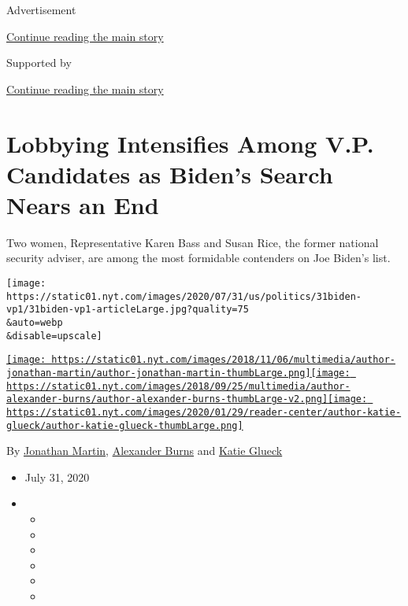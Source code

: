 Advertisement

\protect\hyperlink{after-top}{Continue reading the main story}

Supported by

\protect\hyperlink{after-sponsor}{Continue reading the main story}

\hypertarget{lobbying-intensifies-among-vp-candidates-as-bidens-search-nears-an-end}{%
\section{Lobbying Intensifies Among V.P. Candidates as Biden's Search
Nears an
End}\label{lobbying-intensifies-among-vp-candidates-as-bidens-search-nears-an-end}}

Two women, Representative Karen Bass and Susan Rice, the former national
security adviser, are among the most formidable contenders on Joe
Biden's list.

\texttt{[image: https://static01.nyt.com/images/2020/07/31/us/politics/31biden-vp1/31biden-vp1-articleLarge.jpg?quality=75\\\&auto=webp\\\&disable=upscale]}

\href{https://www.nytimes.com/by/jonathan-martin}{\texttt{[image: https://static01.nyt.com/images/2018/11/06/multimedia/author-jonathan-martin/author-jonathan-martin-thumbLarge.png]}}\href{https://www.nytimes.com/by/alexander-burns}{\texttt{[image: https://static01.nyt.com/images/2018/09/25/multimedia/author-alexander-burns/author-alexander-burns-thumbLarge-v2.png]}}\href{https://www.nytimes.com/by/katie-glueck}{\texttt{[image: https://static01.nyt.com/images/2020/01/29/reader-center/author-katie-glueck/author-katie-glueck-thumbLarge.png]}}

By \href{https://www.nytimes.com/by/jonathan-martin}{Jonathan Martin},
\href{https://www.nytimes.com/by/alexander-burns}{Alexander Burns} and
\href{https://www.nytimes.com/by/katie-glueck}{Katie Glueck}

\begin{itemize}
\item
  July 31, 2020
\item
  \begin{itemize}
  \item
  \item
  \item
  \item
  \item
  \item
  \end{itemize}
\end{itemize}

